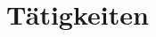 \documentclass[a4paper,10pt]{article} %
\begin{document}
 
 
 
 
\section{Tätigkeiten}
 
\end{document}
